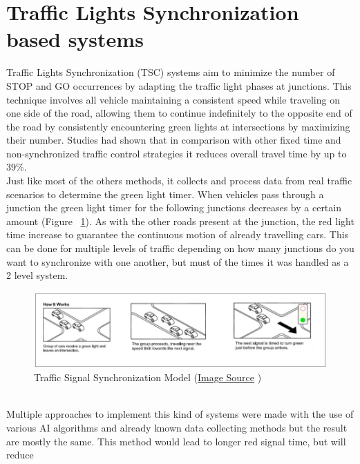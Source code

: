 \documentclass[17pt]{report}
\begin{document}
\section{Traffic Lights Synchronization based systems}
\indent \indent
Traffic Lights Synchronization (TSC) \cite{Tomar2022} systems aim  to minimize
the number of STOP and GO occurrences by adapting the traffic light phases at junctions.
This technique involves all vehicle maintaining a consistent speed while traveling on one side
of the road, allowing them to continue indefinitely to the opposite end of the road by consistently
encountering green lights at intersections by maximizing their number.
Studies had shown that in comparison with other fixed time and
non-synchronized traffic control strategies it reduces overall travel time by
up to 39\%. \cite{Kenney2011IOT}\\
\indent \indent
Just like most of the others methods, it collects and process data from real traffic
scenarios to determine the green light timer. When vehicles pass through a junction the
green light timer for the following junctions decreases by a certain amount
(Figure ~\ref{fig:TrafficSignalSynchronization}). As with the other roads present at
the junction, the red light time increase to guarantee the continuous motion of already
travelling cars. This can be done for multiple levels of traffic depending on how many
junctions do you want to synchronize with one another, but must of the times it
was handled as a 2 level system.
\begin{figure}[h!]
    \includegraphics[width=\textwidth]{TrafficSignalSynchronization.jpg}
    \caption{Traffic Signal Synchronization Model 
    (\href{https://www.cityofirvine.org/signal-operations-maintenance/traffic-signal-synchronization}{Image Source} \textcopyright)}
    \label{fig:TrafficSignalSynchronization}
\end{figure}\\
\indent \indent
Multiple approaches to implement this kind of systems were made with the use of
various AI algorithms and already known data collecting methods but the result are
mostly the same. This method would lead to longer red signal time, but will reduce
\end{document}
